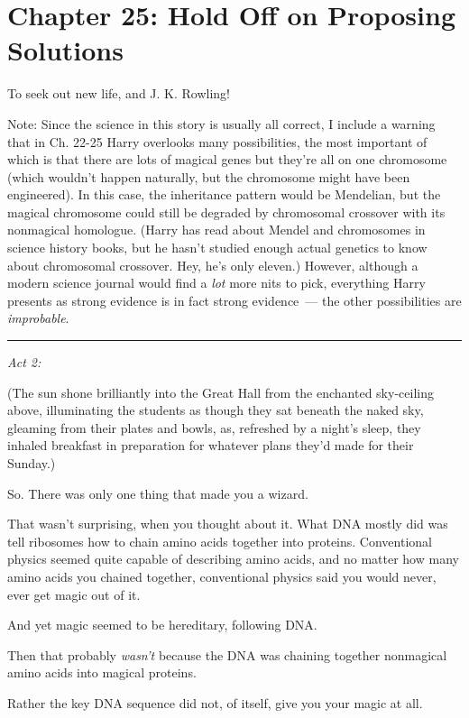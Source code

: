 \chapter{Chapter 25: Hold Off on Proposing Solutions}
To seek out new life, and J. K. Rowling!

Note: Since the science in this story is usually all correct, I include a warning that in Ch. 22-25 Harry overlooks many possibilities, the most important of which is that there are lots of magical genes but they're all on one chromosome (which wouldn't happen naturally, but the chromosome might have been engineered). In this case, the inheritance pattern would be Mendelian, but the magical chromosome could still be degraded by chromosomal crossover with its nonmagical homologue. (Harry has read about Mendel and chromosomes in science history books, but he hasn't studied enough actual genetics to know about chromosomal crossover. Hey, he's only eleven.) However, although a modern science journal would find a \emph{lot} more nits to pick, everything Harry presents as strong evidence is in fact strong evidence~--- the other possibilities are \emph{improbable}.

\begin{center}\rule{3in}{0.4pt}\end{center}

\emph{Act 2:}

(The sun shone brilliantly into the Great Hall from the enchanted sky-ceiling above, illuminating the students as though they sat beneath the naked sky, gleaming from their plates and bowls, as, refreshed by a night's sleep, they inhaled breakfast in preparation for whatever plans they'd made for their Sunday.)

So. There was only one thing that made you a wizard.

That wasn't surprising, when you thought about it. What DNA mostly did was tell ribosomes how to chain amino acids together into proteins. Conventional physics seemed quite capable of describing amino acids, and no matter how many amino acids you chained together, conventional physics said you would never, ever get magic out of it.

And yet magic seemed to be hereditary, following DNA.

Then that probably \emph{wasn't} because the DNA was chaining together nonmagical amino acids into magical proteins.

Rather the key DNA sequence did not, of itself, give you your magic at all.

